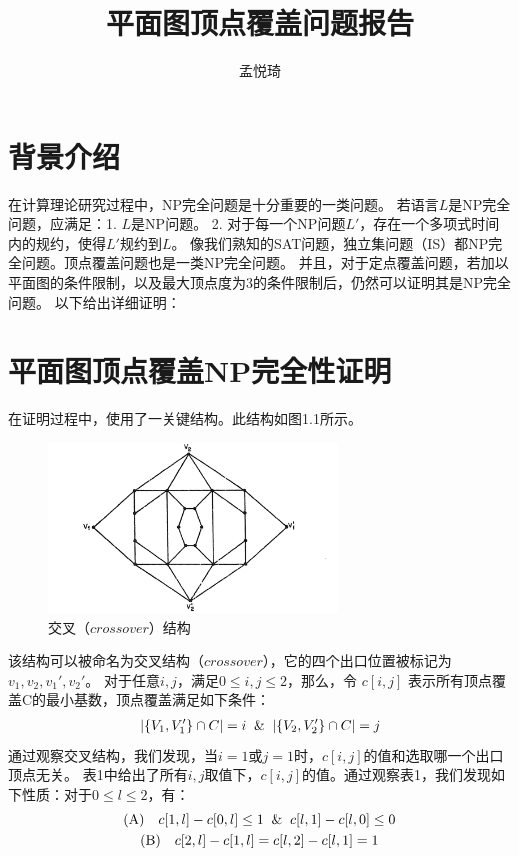\documentclass[UTF8]{ctexart}
\title{平面图顶点覆盖问题报告}
\author{孟悦琦}
\begin{document}
\maketitle

\section{背景介绍}
在计算理论研究过程中，NP完全问题是十分重要的一类问题。
若语言$L$是NP完全问题，应满足：1. $L$是NP问题。 
2. 对于每一个NP问题$L'$，存在一个多项式时间内的规约，使得$L'$规约到$L$。
像我们熟知的SAT问题，独立集问题（IS）都NP完全问题。顶点覆盖问题也是一类NP完全问题。
并且，对于定点覆盖问题，若加以平面图的条件限制，以及最大顶点度为3的条件限制后，仍然可以证明其是NP完全问题。
以下给出详细证明：

\section{平面图顶点覆盖NP完全性证明}
在证明过程中，使用了一关键结构。此结构如图1.1所示。
\begin{figure}[htbp]
    \centering %
    \includegraphics[height=4.5cm]{graph1.png}
    \caption{交叉（$crossover$）结构}
\end{figure}
该结构可以被命名为交叉结构（$crossover$），它的四个出口位置被标记为$v_1,v_2,v_1',v_2'$。
对于任意$i, j$，满足$0 \leq i,j \leq 2$，那么，令 $c[i,j]$ 表示所有顶点覆盖C的最小基数，顶点覆盖满足如下条件：
\begin{gather*}
    |\{V_1, V_1'\} \cap C| = i \And 
    |\{V_2, V_2'\} \cap C| = j
\end{gather*}
通过观察交叉结构，我们发现，当$i=1$或$j=1$时，$c[i,j]$的值和选取哪一个出口顶点无关。
表1中给出了所有$i,j$取值下，$c[i,j]$的值。通过观察表1，我们发现如下性质：对于$0 \leq l \leq 2$，有：
\begin{gather*}
    {\rm (A)} \quad c[1,l] - c[0,l] \leq 1 \And c[l,1] - c[l,0] \leq 0 \\
    {\rm (B)} \quad c[2,l] - c[1,l] =  c[l,2] - c[l,1] = 1
\end{gather*}
\end{document}

